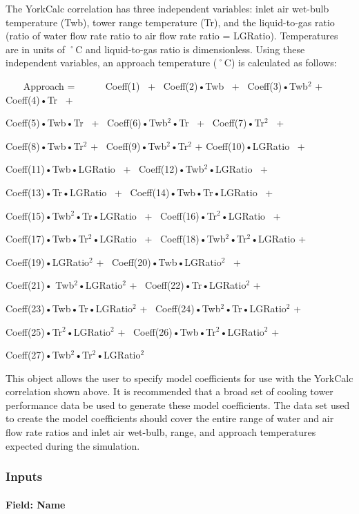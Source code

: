 The YorkCalc correlation has three independent variables: inlet air wet-bulb temperature (Twb), tower range temperature (Tr), and the liquid-to-gas ratio (ratio of water flow rate ratio to air flow rate ratio = LGRatio). Temperatures are in units of ˚C and liquid-to-gas ratio is dimensionless. Using these independent variables, an approach temperature (˚C) is calculated as follows:

~~~ Approach = ~~~~~ Coeff(1)~ +~ Coeff(2)•Twb~ +~ Coeff(3)•Twb\(^{2}\) +~ Coeff(4)•Tr~ +

Coeff(5)•Twb•Tr~ +~ Coeff(6)•Twb\(^{2}\)•Tr~ +~ Coeff(7)•Tr\(^{2}\)~ +

Coeff(8)•Twb•Tr\(^{2}\) +~ Coeff(9)•Twb\(^{2}\)•Tr\(^{2}\) + Coeff(10)•LGRatio~ +

Coeff(11)•Twb•LGRatio~ +~ Coeff(12)•Twb\(^{2}\)•LGRatio~ +

Coeff(13)•Tr•LGRatio~ +~ Coeff(14)•Twb•Tr•LGRatio~ +

Coeff(15)•Twb\(^{2}\)•Tr•LGRatio~ +~ Coeff(16)•Tr\(^{2}\)•LGRatio~ +

Coeff(17)•Twb•Tr\(^{2}\)•LGRatio~ +~ Coeff(18)•Twb\(^{2}\)•Tr\(^{2}\)•LGRatio +

Coeff(19)•LGRatio\(^{2}\) +~ Coeff(20)•Twb•LGRatio\(^{2}\)~ +

Coeff(21)• Twb\(^{2}\)•LGRatio\(^{2}\) +~ Coeff(22)•Tr•LGRatio\(^{2}\) +

Coeff(23)•Twb•Tr•LGRatio\(^{2}\) +~ Coeff(24)•Twb\(^{2}\)•Tr•LGRatio\(^{2}\) +

Coeff(25)•Tr\(^{2}\)•LGRatio\(^{2}\) +~ Coeff(26)•Twb•Tr\(^{2}\)•LGRatio\(^{2}\) +

Coeff(27)•Twb\(^{2}\)•Tr\(^{2}\)•LGRatio\(^{2}\)

This object allows the user to specify model coefficients for use with the YorkCalc correlation shown above. It is recommended that a broad set of cooling tower performance data be used to generate these model coefficients. The data set used to create the model coefficients should cover the entire range of water and air flow rate ratios and inlet air wet-bulb, range, and approach temperatures expected during the simulation.

\subsubsection{Inputs}\label{inputs-5-005}

\paragraph{Field: Name}\label{field-name-4-005}

